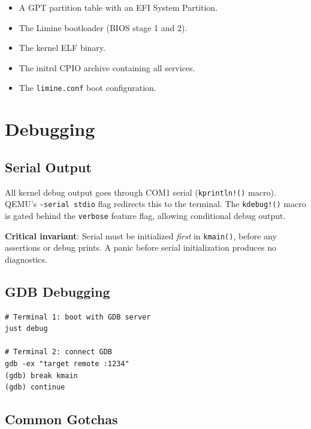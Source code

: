 \documentclass[11pt,a4paper,twoside]{report}
\theoremstyle{definition}
\begin{document}
\begin{itemize}[leftmargin=1.4em]
  \item A GPT partition table with an EFI System Partition.
  \item The Limine bootloader (BIOS stage 1 and 2).
  \item The kernel ELF binary.
  \item The initrd CPIO archive containing all services.
  \item The \texttt{limine.conf} boot configuration.
\end{itemize}


\chapter{Debugging}
\label{ch:debug}

\section{Serial Output}

All kernel debug output goes through COM1 serial (\texttt{kprintln!()} macro).
QEMU's \texttt{-serial stdio} flag redirects this to the terminal. The
\texttt{kdebug!()} macro is gated behind the \texttt{verbose} feature flag,
allowing conditional debug output.

\textbf{Critical invariant}: Serial must be initialized \emph{first} in
\texttt{kmain()}, before any assertions or debug prints. A panic before
serial initialization produces no diagnostics.

\section{GDB Debugging}

\begin{lstlisting}[language={},caption={GDB debugging session.}]
# Terminal 1: boot with GDB server
just debug

# Terminal 2: connect GDB
gdb -ex "target remote :1234"
(gdb) break kmain
(gdb) continue
\end{lstlisting}

\section{Common Gotchas}
\end{document}
